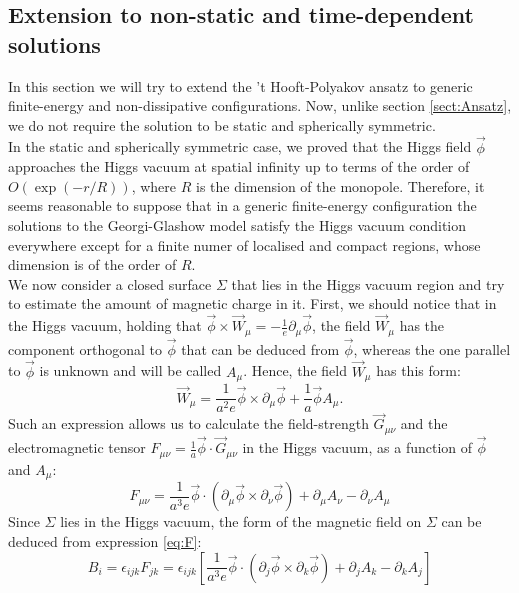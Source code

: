 \documentclass[main.tex]{subfiles}
\begin{document}
\subsection{Extension to non-static and time-dependent solutions}
\label{sect:top}
In this section we will try to extend the 't Hooft-Polyakov ansatz to generic finite-energy and non-dissipative configurations. Now, unlike section \ref{sect:Ansatz}, we do not require the solution to be static and spherically symmetric. \\
In the static and spherically symmetric case, we proved that the Higgs field $\vec{\phi}$ approaches the Higgs vacuum at spatial infinity up to terms of the order of $O(\exp(-r/R))$, where $R$ is the dimension of the monopole.
Therefore, it seems reasonable to suppose that in a generic finite-energy configuration the solutions to the Georgi-Glashow model satisfy the Higgs vacuum condition everywhere except for a finite numer of localised and compact regions, whose dimension is of the order of $R$.\\
We now consider a closed surface $\Sigma$ that lies in the Higgs vacuum region and try to estimate the amount of magnetic charge in it. 
First, we should notice that in the Higgs vacuum, holding that $ \vec{\phi} \times \vec{W}_\mu = - \frac{1}{e} \partial_\mu \vec{\phi}$, the field $\vec{W}_\mu $ has the component orthogonal to $\vec{\phi}$ that can be deduced from $\vec{\phi}$, whereas the one parallel to $\vec{\phi}$ is unknown and will be called $A_\mu$. Hence, the field $\vec{W}_{\mu}$ has this form: 
\begin{equation}
\vec{W}_{\mu} = \frac{1}{a^2 e} \vec{\phi} \times \partial_\mu \vec{\phi} + \frac{1}{a}\vec{\phi} A_\mu . 
\end{equation}
Such an expression allows us to calculate the field-strength $\vec{G}_{\mu \nu}$ and the electromagnetic tensor $F_{\mu \nu} = \frac{1}{a} \vec{\phi}\cdot \vec{G}_{\mu \nu}$ in the Higgs vacuum, as a function of $\vec{\phi}$ and $A_\mu$: 
\begin{equation}
F_{\mu \nu}  = \frac{1}{a^3 e}\vec{\phi}\cdot \left(  \partial_\mu \vec{\phi}  \times  \partial_\nu \vec{\phi} \right) + \partial_\mu A_\nu -\partial_\nu A_\mu
\label{eq:F}
\end{equation}
Since $\Sigma $ lies in the Higgs vacuum, the form of the magnetic field on $\Sigma$ can be deduced from expression \ref{eq:F}:
\begin{equation}
B_i = \epsilon_{ijk} F_{jk} =   \epsilon_{ijk} \left[ \frac{1}{a^3 e} \vec{\phi}\cdot \left(  \partial_j \vec{\phi}  \times  \partial_k \vec{\phi} \right) + \partial_j A_k -\partial_k A_j \right]
\end{equation}
\end{document}
